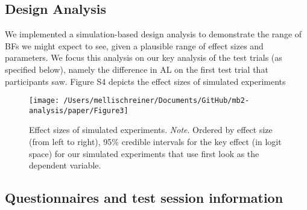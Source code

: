 \documentclass[
  man, donotrepeattitle,floatsintext]{apa6}
\begin{document}
\subsection{Design Analysis}\label{design-analysis}

We implemented a simulation-based design analysis to demonstrate the range of BFs we might expect to see, given a plausible range of effect sizes and parameters. We focus this analysis on our key analysis of the test trials (as specified below), namely the difference in AL on the first test trial that participants saw. Figure S4 depicts the effect sizes of simulated experiments

\begin{figure}

\texttt{[image: /Users/mellischreiner/Documents/GitHub/mb2-analysis/paper/Figure3]} \hfill{}

\caption{Effect sizes of simulated experiments. \newline{} \textit{Note}. Ordered by effect size (from left to right), 95\% credible intervals for the key effect (in logit space) for our simulated experiments that use first look as the dependent variable.}\label{fig:figS4}
\end{figure}

\subsection{Questionnaires and test session information}\label{questionnaires-and-test-session-information}
\end{document}
